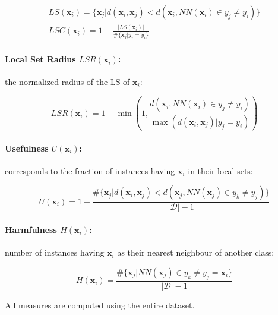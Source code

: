 \begin{gather}
	LS(\mathbf{x}_i) = \{ \mathbf{x}_j | d(\mathbf{x}_i, \mathbf{x}_j) < d(\mathbf{x}_i, NN(\mathbf{x}_i) \in y_j \neq y_i) \} \\
	LSC(\mathbf{x}_i) = 1 - \frac{|LS(\mathbf{x}_i)|}{\# \{ \mathbf{x}_j | y_j = y_i \}}
\end{gather}

\paragraph*{Local Set Radius $LSR(\mathbf{x}_i)$:} the normalized radius of the LS of $\mathbf{x}_i$:

\begin{equation}
	LSR(\mathbf{x}_i) = 1 - \min \left( 1, \frac{d(\mathbf{x}_i, NN(\mathbf{x}_i) \in y_j \neq y_i )}{\max(d(\mathbf{x}_i, \mathbf{x}_j) | y_j = y_i)} \right)
\end{equation}

\paragraph*{Usefulness $U(\mathbf{x}_i)$:} corresponds to the fraction of instances having $\mathbf{x}_i$ in their local sets:

\begin{equation}
	U(\mathbf{x}_i) = 1 - \frac{\# \{ \mathbf{x}_j | d(\mathbf{x}_i, \mathbf{x}_j) < d(\mathbf{x}_j, NN(\mathbf{x}_j) \in y_k \neq y_j) \}}{|\mathcal{D}| - 1}
\end{equation}

\paragraph*{Harmfulness $H(\mathbf{x}_i)$:} number of instances having $\mathbf{x}_i$ as their nearest neighbour of another class:

\begin{equation}
	H(\mathbf{x}_i) = \frac{\# \{ \mathbf{x}_j | NN(\mathbf{x}_j) \in y_k \neq y_j = \mathbf{x}_i \}}{|\mathcal{D}| - 1}
\end{equation}

All measures are computed using the entire dataset.